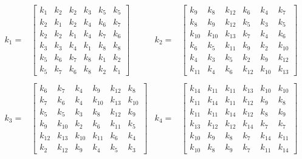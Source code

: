 \begingroup
\renewcommand*{\arraystretch}{1.2}
\begin{align*}
k_1 =& \begin{bmatrix}
k_1 & k_2 & k_2 & k_3 & k_5 & k_5 \\ 
k_2 & k_1 & k_2 & k_4 & k_6 & k_7 \\ 
k_2 & k_2 & k_1 & k_4 & k_7 & k_6 \\ 
k_3 & k_3 & k_4 & k_1 & k_8 & k_8 \\ 
k_5 & k_6 & k_7 & k_8 & k_1 & k_2 \\ 
k_5 & k_7 & k_6 & k_8 & k_2 & k_1
\end{bmatrix}
&k_ 2 =& \begin{bmatrix}
k_9 & k_8 & k_{12} & k_6 & k_4 & k_7 \\ 
k_8 & k_9 & k_{12} & k_5 & k_3 & k_5 \\ 
k_{10} & k_{10} & k_{13} & k_7 & k_4 & k_6 \\ 
k_6 & k_5 & k_{11} & k_9 & k_2 & k_{10} \\ 
k_4 & k_3 & k_5 & k_2 & k_9 & k_{12} \\ 
k_{11} & k_4 & k_6 & k_{12} & k_{10} & k_{13}
\end{bmatrix}\\ \nonumber \\
k_3 =& \begin{bmatrix}
k_6 & k_7 & k_4 & k_9 & k_{12} & k_8 \\ 
k_7 & k_6 & k_4 & k_{10} & k_{13} & k_{10} \\ 
k_5 & k_5 & k_3 & k_8 & k_{12} & k_9 \\ 
k_9 & k_{10} & k_2 & k_6 & k_{11} & k_5 \\ 
k_{12} & k_{13} & k_{10} & k_{11} & k_6 & k_4 \\ 
k_2 & k_{12} & k_9 & k_4 & k_5 & k_3
\end{bmatrix}
&k_4 =& \begin{bmatrix}
k_{14} &k_{ 11} & k_{11} & k_{13} & k_{10} & k_{10} \\ 
k_{11} & k_{14} & k_{11} & k_{12} & k_9 & k_8 \\ 
k_{11}& k_{11} & k_{14} & k_{12} & k_8 & k_9 \\ 
k_{13} & k_{12} & k_{12} & k_{14} & k_7 & k_7 \\ 
k_{10} & k_9 & k_8 & k_7 & k_ {14} & k_{11} \\ 
k_{10}& k_8 & k_9 & k_7 & k_{11} & k_{14}
\end{bmatrix}\\ \nonumber \\

\end{align*}
